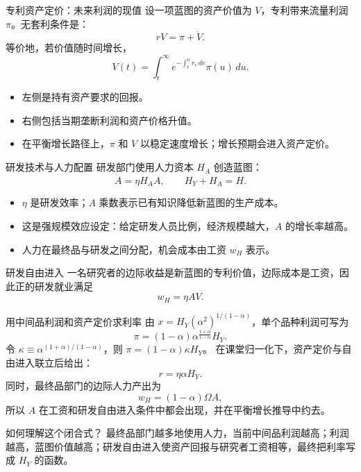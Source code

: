\documentclass[aspectratio=32]{beamer}
\begin{document}
\begin{frame}{专利资产定价：未来利润的现值}
\small
设一项蓝图的资产价值为 $V$，专利带来流量利润 $\pi$。无套利条件是：
\[
  \boxed{rV=\pi+\dot V}.
\]
等价地，若价值随时间增长，
\[
  V(t)=\int_t^\infty e^{-\int_t^u r_v\,dv}\pi(u)\,du.
\]
\begin{itemize}
  \item 左侧是持有资产要求的回报。
  \item 右侧包括当期垄断利润和资产价格升值。
  \item 在平衡增长路径上，$\pi$ 和 $V$ 以稳定速度增长；增长预期会进入资产定价。
\end{itemize}
\end{frame}

\begin{frame}{研发技术与人力配置}
\small
研发部门使用人力资本 $H_A$ 创造蓝图：
\[
  \boxed{\dot A=\eta H_AA},
  \qquad H_Y+H_A=H.
\]
\begin{itemize}
  \item $\eta$ 是研发效率；$A$ 乘数表示已有知识降低新蓝图的生产成本。
  \item 这是强规模效应设定：给定研发人员比例，经济规模越大，$A$ 的增长率越高。
  \item 人力在最终品与研发之间分配，机会成本由工资 $w_H$ 表示。
\end{itemize}
\begin{block}{研发自由进入}
一名研究者的边际收益是新蓝图的专利价值，边际成本是工资，因此正的研发就业满足
\[
  \boxed{w_H=\eta A V}.
\]
\end{block}
\end{frame}

\begin{frame}{用中间品利润和资产定价求利率}
\small
由 $x=H_Y(\alpha^2)^{1/(1-\alpha)}$，单个品种利润可写为
\[
  \pi=(1-\alpha)\alpha^{\frac{1+\alpha}{1-\alpha}}H_Y.
\]
令 $\kappa\equiv\alpha^{(1+\alpha)/(1-\alpha)}$，则 $\pi=(1-\alpha)\kappa H_Y$。
在课堂归一化下，资产定价与自由进入联立后给出：
\[
  \boxed{r=\eta\alpha H_Y}.
\]
同时，最终品部门的边际人力产出为
\[
  w_H=(1-\alpha)\Omega A,
\]
所以 $A$ 在工资和研发自由进入条件中都会出现，并在平衡增长推导中约去。
\begin{block}{如何理解这个闭合式？}
最终品部门越多地使用人力，当前中间品利润越高；利润越高，蓝图价值越高；研发自由进入使资产回报与研究者工资相等，最终把利率写成 $H_Y$ 的函数。
\end{block}
\end{frame}
\end{document}
